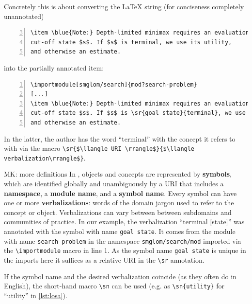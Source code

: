 \documentclass[runningheads]{llncs}
\def\llangle{\langle\kern-.2em\langle}
\def\rrangle{\rangle\kern-.2em\rangle}
\begin{document}
Concretely this is about converting the {\LaTeX} string
    (for conciseness completely unannotated)
\begin{lstlisting}[numbers=left,firstnumber=3,
caption=The unannotated {\LaTeX} sources of \cref{fig:lo},label=lst:los]
\item \blue{Note:} Depth-limited minimax requires an evaluation for every
cut-off state $s$. If $s$ is terminal, we use its utility,
and otherwise an estimate.
\end{lstlisting}
into the partially annotated item:
\begin{lstlisting}[morekeywords={sr,importmodule},numbers=left,
caption=Annotating ``terminal'' in \cref{lst:los},label=lst:losa]
\importmodule[smglom/search]{mod?search-problem}
[...]
\item \blue{Note:} Depth-limited minimax requires an evaluation for every
cut-off state $s$. If $s$ is \sr{goal state}{terminal}, we use its utility,
and otherwise an estimate.
\end{lstlisting}
In the latter, the author has the word ``terminal'' with the concept it refers to with 
via the \sTeX macro
\lstinline[mathescape]|\sr{$\llangle URI \rrangle$}{$\llangle verbalization\rrangle$}|.

\begin{newpart}{MK: more definitions}
  In \sTeX, objects and concepts are represented by \textbf{symbols}, which are identified
globally and unambiguously by a URI that includes a \textbf{namespace}, a \textbf{module
  name}, and a \textbf{symbol name}. Every symbol can have one or more
\textbf{verbalizations}:
words of the domain jargon used to refer to the concept or object.
Verbalizations can vary between between subdomains and communities of practice. In
our example, the verbalization ``terminal [state]'' was annotated with the symbol with
name \lstinline|goal state|. It comes from the module with name \lstinline|search-problem|
in the namespace \lstinline|smglom/search/mod| imported via the \lstinline|\importmodule|
macro in line 1. As the symbol name \lstinline|goal state| is unique in the imports here
it suffices as a relative URI in the \lstinline|\sr| annotation.

If the symbol name and the desired verbalization coincide (as they often do in English),
the short-hand macro \lstinline|\sn| can be used (e.g. as \lstinline|\sn{utility}| for ``utility'' in \cref{lst:losa}).
\end{newpart}
\end{document}
